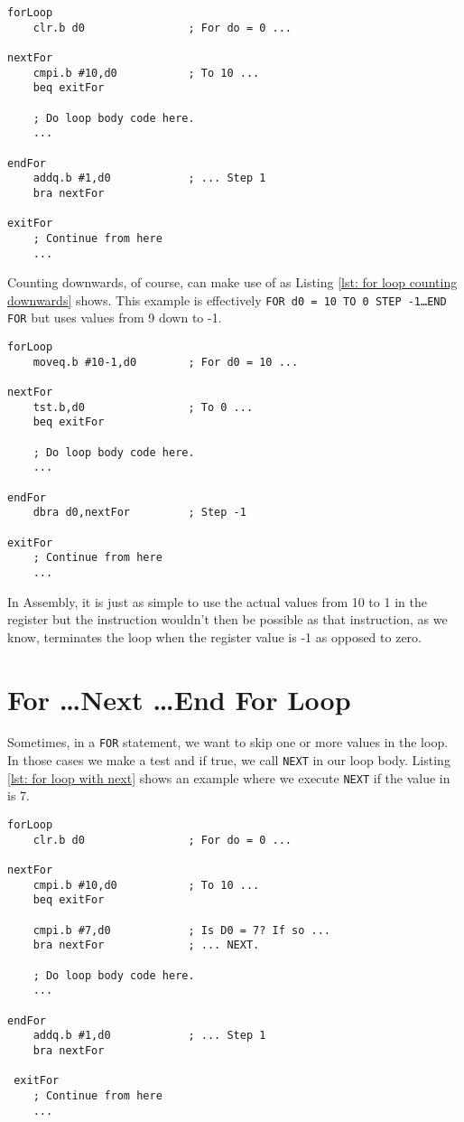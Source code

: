 \begin{lstlisting}[caption={FOR \ldots END FOR forwards STEP},label={lst: for loop counting upwards}]
forLoop
    clr.b d0                ; For do = 0 ...
    
nextFor
    cmpi.b #10,d0           ; To 10 ...
    beq exitFor
    
    ; Do loop body code here.
    ...

endFor
    addq.b #1,d0            ; ... Step 1
    bra nextFor

exitFor
    ; Continue from here
    ...
\end{lstlisting}

Counting downwards, of course, can make use of  as Listing \ref{lst: for loop counting downwards} shows. This example is effectively \texttt{FOR d0 = 10 TO 0 STEP -1\ldots{}END FOR} but uses values from 9 down to -1.

\begin{lstlisting}[caption={FOR \ldots END FOR backwards STEP},label={lst: for loop counting downwards}]
forLoop
    moveq.b #10-1,d0        ; For d0 = 10 ...
    
nextFor
    tst.b,d0                ; To 0 ...
    beq exitFor
    
    ; Do loop body code here.
    ...
    
endFor
    dbra d0,nextFor         ; Step -1
    
exitFor
    ; Continue from here
    ...
\end{lstlisting}

In Assembly, it is just as simple to use the actual values from 10 to 1 in the register but the  instruction wouldn't then be possible as that instruction, as we know, terminates the loop when the register value is -1 as opposed to zero.

\section{For \ldots\protect Next \ldots\protect End For Loop}

Sometimes, in a \texttt{FOR} statement, we want to skip one or more values in the loop. In those cases we make a test and if true, we call \texttt{NEXT} in our loop body. Listing \ref{lst: for loop with next} shows an example where we execute \texttt{NEXT} if the value in  is 7.

\begin{lstlisting}[caption={FOR \ldots NEXT \ldots END FOR},label={lst: for loop with next}]
forLoop
    clr.b d0                ; For do = 0 ...
    
nextFor
    cmpi.b #10,d0           ; To 10 ...
    beq exitFor
    
    cmpi.b #7,d0            ; Is D0 = 7? If so ...
    bra nextFor             ; ... NEXT.
    
    ; Do loop body code here.
    ...
    
endFor
    addq.b #1,d0            ; ... Step 1
    bra nextFor
    
 exitFor
    ; Continue from here
    ...
\end{lstlisting}

